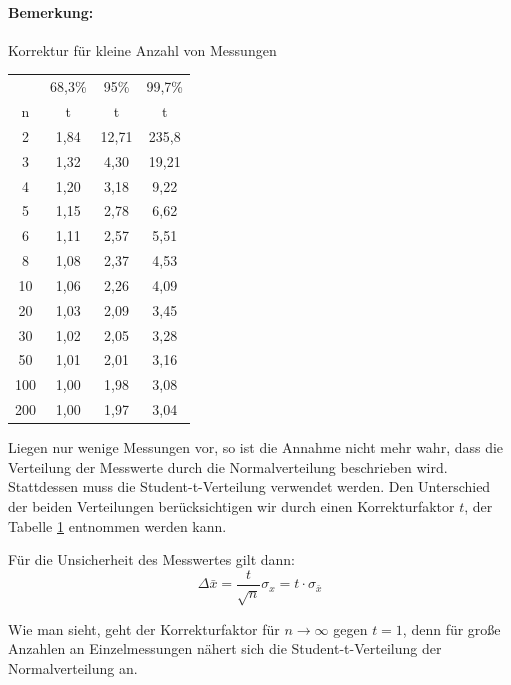 \paragraph{Bemerkung:} Korrektur für kleine Anzahl von Messungen

\begin{table}[t]	
	\centering
		\begin{tabular}[t]{|c|c|c|c|} 
			 & 68,3\% & 95\% & 99,7\% \\ 
			n & t & t & t \\\hline
			2 & 1,84 & 12,71 & 235,8 \\
			3 & 1,32 & 4,30 & 19,21 \\
			4 & 1,20 & 3,18 & 9,22 \\
			5 & 1,15 & 2,78 & 6,62 \\
			6 & 1,11 & 2,57 & 5,51 \\
			8 & 1,08 & 2,37 & 4,53 \\
			10 & 1,06 & 2,26 & 4,09 \\
			20 & 1,03 & 2,09 & 3,45 \\
			30 & 1,02 & 2,05 & 3,28 \\
			50 & 1,01 & 2,01 & 3,16 \\
			100 & 1,00 & 1,98 & 3,08 \\
			200 & 1,00 & 1,97 & 3,04 
		\end{tabular}
	\label{tab:Student-t}
\end{table}

\noindent
Liegen nur wenige Messungen vor, so ist die Annahme nicht mehr wahr, dass die Verteilung der Messwerte durch die Normalverteilung beschrieben wird. Stattdessen muss die Student-t-Verteilung verwendet werden. Den Unterschied der beiden Verteilungen berücksichtigen wir durch einen Korrekturfaktor $t$, der Tabelle \ref{tab:Student-t} entnommen werden kann.

\noindent
Für die Unsicherheit des Messwertes gilt dann:
\begin{equation}
 \Delta \bar{x} = \frac{t}{\sqrt{n}}\sigma_x = t\cdot \sigma_{\bar{x}}
\end{equation}

Wie man sieht, geht der Korrekturfaktor für $n\rightarrow\infty$ gegen $t=1$, denn für große Anzahlen an Einzelmessungen nähert sich die Student-t-Verteilung der Normalverteilung an.

